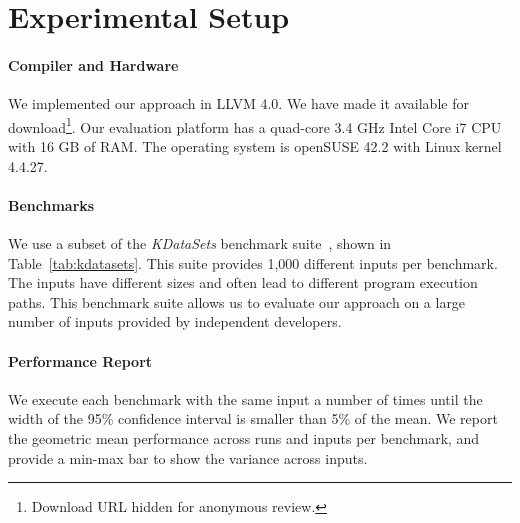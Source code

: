 \section{Experimental Setup}\label{sec:setup}

\paragraph{Compiler and Hardware} We implemented our approach in LLVM 4.0.
We have made it available for download\footnote{Download URL hidden for anonymous review.}.
Our evaluation platform has a quad-core 3.4 GHz Intel Core i7 CPU with 16 GB of RAM.
The operating system is openSUSE 42.2 with Linux kernel 4.4.27.


\paragraph{Benchmarks}
We use a subset of the \textit{KDataSets} benchmark suite~\cite{chen10,chen12a},
shown in Table~\ref{tab:kdatasets}.
This suite provides 1,000 different inputs per benchmark.
The inputs have different sizes and often lead to different program execution paths.
This benchmark suite allows us to evaluate our approach on a large number of inputs provided by independent
developers.





\paragraph{Performance Report}
We execute each benchmark with the same input a number of times until the width of the 95\% confidence interval is smaller than 5\% of the
mean. We report the geometric mean performance  across runs and inputs per benchmark, and provide a min-max
bar to show the variance across inputs. 


